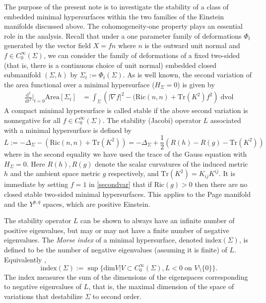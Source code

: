 \documentclass[11pt]{amsart}
\theoremstyle{plain}
\newcommand{\td}{\text{d}}
\theoremstyle{definition}
\numberwithin{equation}{section}
\begin{document}
The purpose of the present note is to investigate the stability of a class of embedded minimal hypersurfaces within the two families of the Einstein manifolds discussed above. The cohomogeneity-one property plays an essential role in the analysis.  Recall that under a one parameter family of deformations $\Phi_t$ generated by the vector field $X = f n$ where $n$ is the outward unit normal and $f \in C^\infty_0 (\Sigma)$, we can consider the family of deformations of a fixed two-sided (that is, there is a continuous choice of unit normal) embedded closed submanifold $(\Sigma,h)$ by $\Sigma_t:=\Phi_t(\Sigma)$.  As is well known, the second variation of the area functional over a minimal hypersurface ($H_\Sigma =0$) is given by
\begin{align}\label{secondvar}
\frac{\td^2}{\td t^2}{\Bigg|}_{t=0} \text{Area}[\Sigma_t] & =\int_\Sigma \left(|\nabla f|^2 - (\text{Ric}(n,n) + \text{Tr} (K^2)f^2 \right)\; \td \text{vol}
\end{align} A compact minimal hypersurface is called stable if the above second variation is nonnegative for all $f \in C^\infty_0(\Sigma)$. The stability (Jacobi) operator $L$ associated with a minimal hypersurface is defined by
\begin{equation}
    L:= -\Delta_\Sigma - (\text{Ric}(n,n) + \text{Tr} (K^2))  = -\Delta_\Sigma + \frac{1}{2} (R(h) - R(g) - \text{Tr} (K^2))
\end{equation} where in the second equality we have used the trace of the Gauss equation with $H_\Sigma =0$. Here $R(h), R(g)$ denote the scalar curvatures of the induced metric $h$ and the ambient space metric $g$ respectively, and $\text{Tr} (K^2) = K_{ij} K^{ij}$. It is immediate by setting $f = 1$ in \eqref{secondvar} that if $\text{Ric}(g) >0$ then there are no closed stable two-sided minimal hypersurfaces. This applies to the Page manifold and the $Y^{p,q}$ spaces, which are positive Einstein.  

The stability operator $L$ can be shown to always have an infinite number of positive eigenvalues, but may or may not have a finite number of negative eigenvalues. The \emph{Morse index} of a minimal hypersurface, denoted $\text{index}(\Sigma)$, is defined to be the number of negative eigenvalues (assuming it is finite) of $L$. Equivalently \cite{Chodosh},
\begin{equation}
    \text{index}(\Sigma):=\sup \{ \text{dim} V | V \subset C^\infty_0(\Sigma), L < 0 \; \text{on } V \setminus \{0\} \}.
\end{equation} The index measures the sum of the dimensions of the eigenspaces corresponding
to negative eigenvalues of $L$, that is, the maximal dimension of the space of variations that destabilize $\Sigma$ to second order. 
\end{document}
